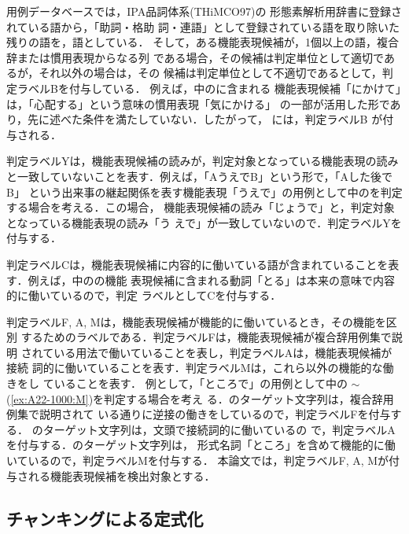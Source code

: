 \documentclass[japanese]{jnlp_1.2d}
\newcommand{\strref}[1]{}
\newcommand{\tabref}[1]{}
\begin{document}
用例データベースでは，IPA品詞体系(THiMCO97)の
形態素解析用辞書\cite{ipadic-2.6.1}に登録されている語から，「助詞・格助
詞・連語」として登録されている語を取り除いた残りの語を，語としている．
そして，ある機能表現候補が，1個以上の語，複合辞または慣用表現からなる列
である場合，その候補は判定単位として適切であるが，それ以外の場合は，その
候補は判定単位として不適切であるとして，判定ラベルBを付与している．
例えば，\tabref{tbl:判定ラベル体系}中の\strref{ex:A43-2000:B}に含まれる
機能表現候補「にかけて」は，「心配する」という意味の慣用表現「気にかける」
の一部が活用した形であり，先に述べた条件を満たしていない．したがって，
\strref{ex:A43-2000:B}には，判定ラベルB が付与される．

判定ラベルYは，機能表現候補の読みが，判定対象となっている機能表現の読み
と一致していないことを表す．例えば，「AうえでB」という形で，「Aした後でB」
という出来事の継起関係を表す機能表現「うえで」の用例として\tabref{tbl:判
定ラベル体系}中の\strref{ex:A12-1000:Y}を判定する場合を考える．この場合，
機能表現候補の読み「じょうで」と，判定対象となっている機能表現の読み「う
えで」が一致していないので．判定ラベルYを付与する．

判定ラベルCは，機能表現候補に内容的に働いている語が含まれていることを表
す．例えば，\tabref{tbl:判定ラベル体系}中の\strref{ex:A56-1000:C}の機能
表現候補に含まれる動詞「とる」は本来の意味で内容的に働いているので，判定
ラベルとしてCを付与する．

判定ラベルF, A, Mは，機能表現候補が機能的に働いているとき，その機能を区別
するためのラベルである．判定ラベルFは，機能表現候補が複合辞用例集で説明
されている用法で働いていることを表し，判定ラベルAは，機能表現候補が接続
詞的に働いていることを表す．判定ラベルMは，これら以外の機能的な働きをし
ていることを表す．
例として，「ところで」の用例として\tabref{tbl:判定ラベル体系}中の
\strref{ex:A22-1000:F}$\sim$(\ref{ex:A22-1000:M})を判定する場合を考え
る．\strref{ex:A22-1000:F}のターゲット文字列は，複合辞用例集で説明されて
いる通りに逆接の働きをしているので，判定ラベルFを付与する．
\strref{ex:A22-1000:A}のターゲット文字列は，文頭で接続詞的に働いているの
で，判定ラベルAを付与する．\strref{ex:A22-1000:M}のターゲット文字列は，
形式名詞「ところ」を含めて機能的に働いているので，判定ラベルMを付与する．
本論文では，判定ラベルF, A, Mが付与される機能表現候補を検出対象とする．



\subsection{チャンキングによる定式化}
\label{subsec:formalization}
\end{document}
